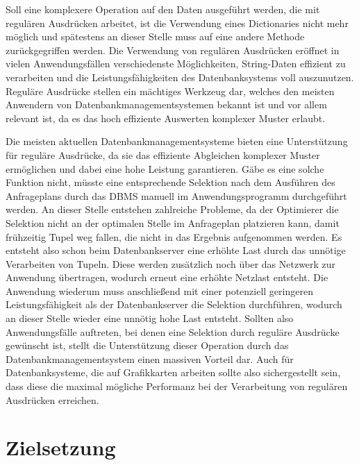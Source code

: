 Soll eine komplexere Operation auf den Daten ausgeführt werden, die mit regulären Ausdrücken arbeitet, ist die Verwendung eines Dictionaries nicht mehr möglich und spätestens an dieser Stelle muss auf eine andere Methode zurückgegriffen werden.
Die Verwendung von regulären Ausdrücken eröffnet in vielen Anwendungsfällen verschiedenste Möglichkeiten, String-Daten effizient zu verarbeiten und die Leistungsfähigkeiten des Datenbanksystems voll auszunutzen.
Reguläre Ausdrücke stellen ein mächtiges Werkzeug dar, welches den meisten Anwendern von Datenbankmanagementsystemen bekannt ist und vor allem relevant ist, da es das hoch effiziente Auswerten komplexer Muster erlaubt.

Die meisten aktuellen Datenbankmanagementsysteme bieten eine Unterstützung für reguläre Ausdrücke, da sie das effiziente Abgleichen komplexer Muster ermöglichen und dabei eine hohe Leistung garantieren.
Gäbe es eine solche Funktion nicht, müsste eine entsprechende Selektion nach dem Ausführen des Anfrageplans durch das DBMS manuell im Anwendungsprogramm durchgeführt werden.
An dieser Stelle entstehen zahlreiche Probleme, da der Optimierer die Selektion nicht an der optimalen Stelle im Anfrageplan platzieren kann, damit frühzeitig Tupel weg fallen, die nicht in das Ergebnis aufgenommen werden.
Es entsteht also schon beim Datenbankserver eine erhöhte Last durch das unnötige Verarbeiten von Tupeln.
Diese werden zusätzlich noch über das Netzwerk zur Anwendung übertragen, wodurch erneut eine erhöhte Netzlast entsteht.
Die Anwendung wiederum muss anschließend mit einer potenziell geringeren Leistungsfähigkeit als der Datenbankserver die Selektion durchführen, wodurch an dieser Stelle wieder eine unnötig hohe Last entsteht.
Sollten also Anwendungsfälle auftreten, bei denen eine Selektion durch reguläre Ausdrücke gewünscht ist, stellt die Unterstützung dieser Operation durch das Datenbankmanagementsystem einen massiven Vorteil dar.
Auch für Datenbanksysteme, die auf Grafikkarten arbeiten sollte also sichergestellt sein, dass diese die maximal mögliche Performanz bei der Verarbeitung von regulären Ausdrücken erreichen.

\section{Zielsetzung}

